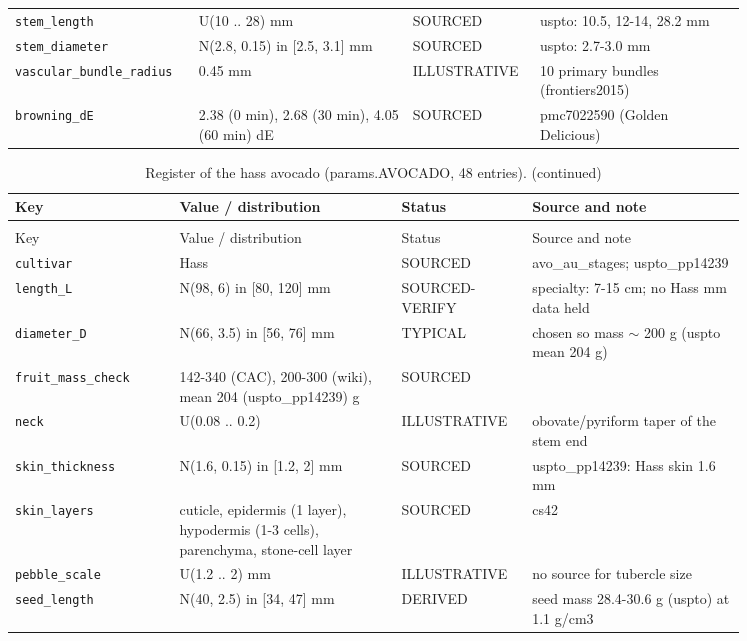 \documentclass[10.5pt,a4paper]{article}
\begin{document}
{\begin{longtable}{@{}p{0.2\linewidth}p{0.27\linewidth}p{0.12\linewidth}p{0.26\linewidth}@{}}
\texttt{stem\_\allowbreak{}length} & U(10 .. 28) mm & SOURCED & uspto: 10.5, 12-14, 28.2 mm \\
\texttt{stem\_\allowbreak{}diameter} & N(2.8, 0.15) in [2.5, 3.1] mm & SOURCED & uspto: 2.7-3.0 mm \\
\texttt{vascular\_\allowbreak{}bundle\_\allowbreak{}radius} & 0.45 mm & ILLUSTRATIVE & 10 primary bundles (frontiers2015) \\
\texttt{browning\_\allowbreak{}dE} & 2.38 (0 min), 2.68 (30 min), 4.05 (60 min) dE & SOURCED & pmc7022590 (Golden Delicious) \\\bottomrule\end{longtable}}
{\scriptsize\begin{longtable}{@{}p{0.2\linewidth}p{0.27\linewidth}p{0.12\linewidth}p{0.26\linewidth}@{}}\caption{Register of the hass avocado (params.AVOCADO, 48 entries).}\\\toprule Key & Value / distribution & Status & Source and note \\\midrule\endfirsthead
\caption[]{Register of the hass avocado (params.AVOCADO, 48 entries). (continued)}\\\toprule Key & Value / distribution & Status & Source and note \\\midrule\endhead
\texttt{cultivar} & Hass & SOURCED & avo\_au\_stages; uspto\_pp14239 \\
\texttt{length\_\allowbreak{}L} & N(98, 6) in [80, 120] mm & SOURCED-VERIFY & specialty: 7-15 cm; no Hass mm data held \\
\texttt{diameter\_\allowbreak{}D} & N(66, 3.5) in [56, 76] mm & TYPICAL & chosen so mass $\sim$ 200 g (uspto mean 204 g) \\
\texttt{fruit\_\allowbreak{}mass\_\allowbreak{}check} & 142-340 (CAC), 200-300 (wiki), mean 204 (uspto\_pp14239) g & SOURCED &  \\
\texttt{neck} & U(0.08 .. 0.2) & ILLUSTRATIVE & obovate/pyriform taper of the stem end \\
\texttt{skin\_\allowbreak{}thickness} & N(1.6, 0.15) in [1.2, 2] mm & SOURCED & uspto\_pp14239: Hass skin 1.6 mm \\
\texttt{skin\_\allowbreak{}layers} & cuticle, epidermis (1 layer), hypodermis (1-3 cells), parenchyma, stone-cell layer & SOURCED & cs42 \\
\texttt{pebble\_\allowbreak{}scale} & U(1.2 .. 2) mm & ILLUSTRATIVE & no source for tubercle size \\
\texttt{seed\_\allowbreak{}length} & N(40, 2.5) in [34, 47] mm & DERIVED & seed mass 28.4-30.6 g (uspto) at 1.1 g/cm3 \\

\end{longtable}}
\end{document}
